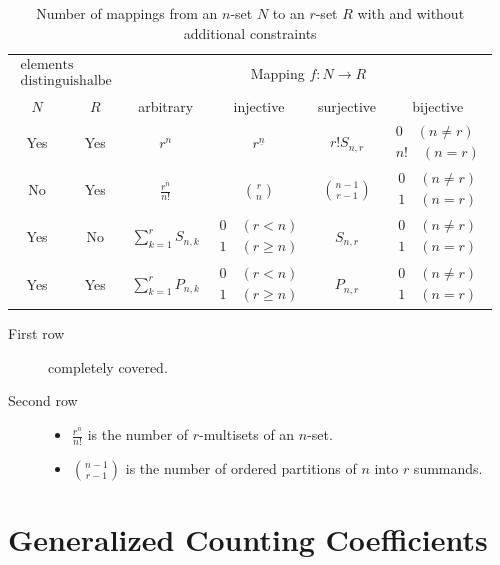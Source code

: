 \documentclass[language=english]{../../Template/TemplateLecture}
\begin{document}
\begin{table}[h]
    \centering
    \begin{tabular}{|cc||c|c|c|c|}
        \hline
        \multicolumn{2}{|c||}{$\substack{\text{elements} \\ \text{distinguishalbe}}$} & \multicolumn{4}{c|}{Mapping $f: N \to R$}\\
        $N$ & $R$ & arbitrary & injective & surjective & bijective \\ \hline \hline
        Yes & Yes & $r^n$ & $r^{\underline{n}}$ & $r! S_{n,r}$ & $\substack{0 \quad (n \neq r) \\ n! \quad (n = r)}$ \\\hline
        No & Yes & $\frac{r^{\overline{n}}}{n!}$ & $\binom{r}{n}$ & $\binom{n-1}{r-1}$ & $\substack{0 \quad (n \neq r) \\ 1 \quad (n = r)}$ \\\hline
        Yes & No & $\sum_{k=1}^r S_{n,k}$ & $\substack{0 \quad (r < n) \\ 1 \quad (r \geq n)}$ & $S_{n,r}$ & $\substack{0 \quad (n \neq r) \\ 1 \quad (n = r)}$ \\\hline
        Yes & Yes & $\sum_{k=1}^r P_{n,k}$ & $\substack{0 \quad (r < n) \\ 1 \quad (r \geq n)}$ & $P_{n,r}$ & $\substack{0 \quad (n \neq r) \\ 1 \quad (n = r)}$ \\\hline
    \end{tabular}
    \caption{Number of mappings from an $n$-set $N$ to an $r$-set $R$ with and without additional constraints}
    \label{tab:mappings}
\end{table}


\begin{description}
    \item[First row] completely covered.
    \item[Second row] \begin{itemize}
        \item $\frac{r^{\overline{n}}}{n!}$ is the number of $r$-multisets of an $n$-set.
        \item $\binom{n-1}{r-1}$ is the number of ordered partitions of $n$ into $r$ summands.
    \end{itemize} 
\end{description}

\section{Generalized Counting Coefficients}
\end{document}

